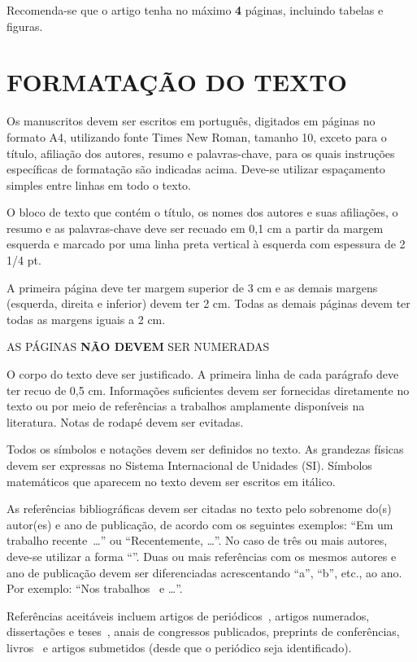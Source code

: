 \documentclass[10pt,fleqn,a4paper,twoside]{article}
\begin{document}
Recomenda-se que o artigo tenha no máximo {\bf 4} páginas, incluindo tabelas e figuras.

\section{FORMATAÇÃO DO TEXTO}

Os manuscritos devem ser escritos em português, digitados em páginas no formato A4, utilizando fonte Times New Roman, tamanho 10, exceto para o título, afiliação dos autores, resumo e palavras-chave, para os quais instruções específicas de formatação são indicadas acima. Deve-se utilizar espaçamento simples entre linhas em todo o texto.

O bloco de texto que contém o título, os nomes dos autores e suas afiliações, o resumo e as palavras-chave deve ser recuado em 0,1 cm a partir da margem esquerda e marcado por uma linha preta vertical à esquerda com espessura de 2 1/4 pt.

A primeira página deve ter margem superior de 3 cm e as demais margens (esquerda, direita e inferior) devem ter 2 cm. Todas as demais páginas devem ter todas as margens iguais a 2 cm.

AS PÁGINAS {\bf NÃO DEVEM} SER NUMERADAS

O corpo do texto deve ser justificado. A primeira linha de cada parágrafo deve ter recuo de 0,5 cm. Informações suficientes devem ser fornecidas diretamente no texto ou por meio de referências a trabalhos amplamente disponíveis na literatura. Notas de rodapé devem ser evitadas.

Todos os símbolos e notações devem ser definidos no texto. As grandezas físicas devem ser expressas no Sistema Internacional de Unidades (SI). Símbolos matemáticos que aparecem no texto devem ser escritos em itálico.

As referências bibliográficas devem ser citadas no texto pelo sobrenome do(s) autor(es) e ano de publicação, de acordo com os seguintes exemplos: ``Em um trabalho recente~\citep{BandarraFilho2011}\dots'' ou ``Recentemente, \citet{BandarraFilho2011}\dots''. No caso de três ou mais autores, deve-se utilizar a forma ``\citep{CavaliniJunior2015}''. Duas ou mais referências com os mesmos autores e ano de publicação devem ser diferenciadas acrescentando ``a'', ``b'', etc., ao ano. Por exemplo: ``Nos trabalhos~\citep{Santos2013a} e \citep{Santos2013b}\dots''.

Referências aceitáveis incluem artigos de periódicos~\citep{MLA04}, artigos numerados, dissertações e teses~\citep{CavaliniJunior2013,coelho2017}, anais de congressos publicados, preprints de conferências, livros~\citep{McConnell.Varoto.2008} e artigos submetidos (desde que o periódico seja identificado).
\end{document}

